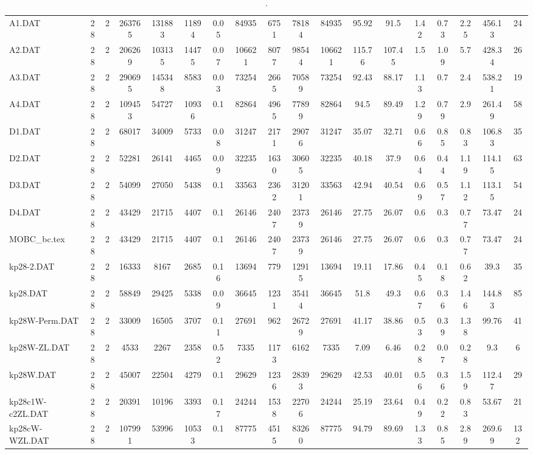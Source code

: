 \begin{sidewaystable}[h]
{\begin{tabular}{lccccccccccccccccc}
A1.DAT & 28 & 2 & 263765 & 131883 & 11894 & 0.05 & 84935 & 6751 & 78184 & 84935 & 95.92 & 91.5 & 1.42 & 0.73 & 2.25 & 456.13 & 24\\
A2.DAT & 28 & 2 & 206269 & 103135 & 14475 & 0.07 & 106621 & 8077 & 98544 & 106621 & 115.76 & 107.45 & 1.5 & 1.09 & 5.7 & 428.34 & 26\\
A3.DAT & 28 & 2 & 290695 & 145348 & 8583 & 0.03 & 73254 & 2665 & 70589 & 73254 & 92.43 & 88.17 & 1.13 & 0.7 & 2.4 & 538.21 & 19\\
A4.DAT & 28 & 2 & 109453 & 54727 & 10936 & 0.1 & 82864 & 4965 & 77899 & 82864 & 94.5 & 89.49 & 1.29 & 0.79 & 2.9 & 261.49 & 58\\
D1.DAT & 28 & 2 & 68017 & 34009 & 5733 & 0.08 & 31247 & 2171 & 29076 & 31247 & 35.07 & 32.71 & 0.66 & 0.85 & 0.83 & 106.83 & 35\\
D2.DAT & 28 & 2 & 52281 & 26141 & 4465 & 0.09 & 32235 & 1630 & 30605 & 32235 & 40.18 & 37.9 & 0.64 & 0.44 & 1.19 & 114.15 & 63\\
D3.DAT & 28 & 2 & 54099 & 27050 & 5438 & 0.1 & 33563 & 2362 & 31201 & 33563 & 42.94 & 40.54 & 0.69 & 0.57 & 1.12 & 113.15 & 54\\
D4.DAT & 28 & 2 & 43429 & 21715 & 4407 & 0.1 & 26146 & 2407 & 23739 & 26146 & 27.75 & 26.07 & 0.6 & 0.3 & 0.77 & 73.47 & 24\\
MOBC\_bc.tex & 28 & 2 & 43429 & 21715 & 4407 & 0.1 & 26146 & 2407 & 23739 & 26146 & 27.75 & 26.07 & 0.6 & 0.3 & 0.77 & 73.47 & 24\\
kp28-2.DAT & 28 & 2 & 16333 & 8167 & 2685 & 0.16 & 13694 & 779 & 12915 & 13694 & 19.11 & 17.86 & 0.45 & 0.18 & 0.62 & 39.3 & 35\\
kp28.DAT & 28 & 2 & 58849 & 29425 & 5338 & 0.09 & 36645 & 1231 & 35414 & 36645 & 51.8 & 49.3 & 0.67 & 0.36 & 1.46 & 144.83 & 85\\
kp28W-Perm.DAT & 28 & 2 & 33009 & 16505 & 3707 & 0.11 & 27691 & 962 & 26729 & 27691 & 41.17 & 38.86 & 0.53 & 0.39 & 1.38 & 99.76 & 41\\
kp28W-ZL.DAT & 28 & 2 & 4533 & 2267 & 2358 & 0.52 & 7335 & 1173 & 6162 & 7335 & 7.09 & 6.46 & 0.28 & 0.07 & 0.28 & 9.3 & 6\\
kp28W.DAT & 28 & 2 & 45007 & 22504 & 4279 & 0.1 & 29629 & 1236 & 28393 & 29629 & 42.53 & 40.01 & 0.56 & 0.36 & 1.59 & 112.47 & 29\\
kp28c1W-c2ZL.DAT & 28 & 2 & 20391 & 10196 & 3393 & 0.17 & 24244 & 1538 & 22706 & 24244 & 25.19 & 23.64 & 0.49 & 0.22 & 0.83 & 53.67 & 21\\
kp28cW-WZL.DAT & 28 & 2 & 107991 & 53996 & 10533 & 0.1 & 87775 & 4515 & 83260 & 87775 & 94.79 & 89.69 & 1.33 & 0.85 & 2.89 & 269.69 & 132\\
\bottomrule
\end{tabular}%
}%
\caption{.}
\label{tab:table_bc}
\end{sidewaystable}


